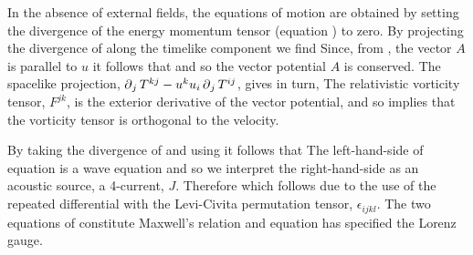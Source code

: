 In the absence of external fields, the equations of motion are obtained by setting the 
 divergence of the energy momentum tensor (equation ) to zero.
By projecting the divergence of  along the timelike component we find
Since, from , the vector $A$ is parallel to $u$  it follows that 
and so the vector potential $A$ is conserved.
The spacelike projection,
$\operatorname{\partial}_j T^{k j} - u^k u_i \operatorname{\partial}_j T^{i j}$, gives in turn,
The relativistic vorticity tensor, $F^{j k}$, is the exterior derivative  of the vector potential, 
and so  implies that the vorticity tensor is orthogonal to the velocity.

By taking the divergence of  and using  it follows that 
The left-hand-side of equation  is a wave equation and so we interpret the right-hand-side as an acoustic source,
a 4-current, $J$.
Therefore 
which follows due to the use of the repeated differential with the Levi-Civita permutation tensor, $\epsilon_{i j k l}$.
The two equations of  constitute Maxwell's relation and equation  has specified the Lorenz gauge.




